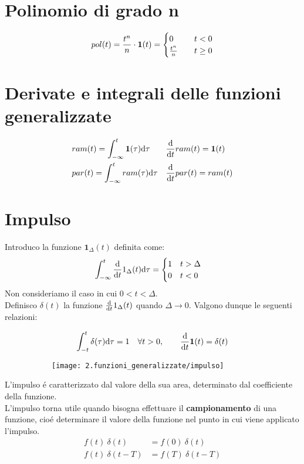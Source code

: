 \documentclass[../main.tex]{subfiles}
\begin{document}
	\section{Polinomio di grado n}
		\[
			pol(t)=\frac{t^n}{n} \cdot \gr =
			\begin{cases}
				0 \quad &t<0\\
				\frac{t^n}{n} \quad &t\geq 0
			\end{cases}
		\]
		
	\section{Derivate e integrali delle funzioni generalizzate}
		\begin{align*}
			&ram(t) = \int_{- \infty}^{t} \gr[\tau] \mathrm{d}\tau &&\der{}{t} ram(t) = \gr\\
			&par(t) = \int_{- \infty}^{t} ram(\tau) \mathrm{d} \tau &&\der{}{t} par(t) = ram(t)	
		\end{align*}
		
	\section{Impulso}
		Introduco la funzione $ \textbf{1}_{\Delta}(t) $ definita come:
		\[
			\int_{- \infty}^{t} \der{}{t}1_{\Delta}(t) \mathrm{d}\tau=
			\begin{cases}
				1 \quad t>\Delta\\
				0 \quad t<0
			\end{cases}
		\]
		Non consideriamo il caso in cui $0<t<\Delta$.\\
		\linebreak
		Definisco $\delta(t)$ la funzione $\der{}{t}1_{\Delta}(t)$ quando $\Delta \longrightarrow 0$. Valgono dunque le seguenti relazioni: 
		\begin{figure}[h!]
			\centering
			\begin{subfigure}{0.5\textwidth}
				\[
				\int_{-t}^{t} \delta(\tau) \mathrm{d}\tau =1 \quad \forall t>0, \qquad \der{}{t} \gr = \delta(t)
				\]
			\end{subfigure}
			\begin{subfigure}{0.4\textwidth}
				\texttt{[image: 2.funzioni\_generalizzate/impulso]}
			\end{subfigure}
		\end{figure}
		\linebreak
		L'impulso \'e caratterizzato dal valore della sua area, determinato dal coefficiente della funzione.\\
		\linebreak
		L'impulso torna utile quando bisogna effettuare il \textbf{campionamento} di una funzione, cio\'e determinare il valore della funzione nel punto in cui viene applicato l'impulso.
		\begin{align*}
			f(t)\ \delta(t) &= f(0)\ \delta(t)\\
			f(t)\ \delta(t - T) &= f(T)\ \delta(t - T)   
		\end{align*}
		
\end{document}
